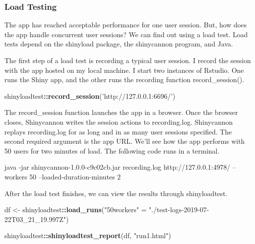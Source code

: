 \documentclass[]{article}
\newenvironment{Shaded}{\begin{snugshade}}{\end{snugshade}}
\newcommand{\ExtensionTok}[1]{#1}
\newcommand{\KeywordTok}[1]{\textcolor[rgb]{0.13,0.29,0.53}{\textbf{#1}}}
\newcommand{\NormalTok}[1]{#1}
\newcommand{\OperatorTok}[1]{\textcolor[rgb]{0.81,0.36,0.00}{\textbf{#1}}}
\newcommand{\StringTok}[1]{\textcolor[rgb]{0.31,0.60,0.02}{#1}}
\begin{document}
\hypertarget{load-testing}{%
\subsubsection{Load Testing}\label{load-testing}}

The app has reached acceptable performance for one user session. But,
how does the app handle concurrent user sessions? We can find out using
a load test. Load tests depend on the shinyload package, the shinycannon
program, and Java.

The first step of a load test is recording a typical user session. I
record the session with the app hosted on my local machine. I start two
instances of Rstudio. One runs the Shiny app, and the other runs the
recording function record\_session().

\begin{Shaded}
\begin{Highlighting}[]
\NormalTok{shinyloadtest}\OperatorTok{::}\KeywordTok{record_session}\NormalTok{(}\StringTok{'http://127.0.0.1:6696/'}\NormalTok{)}
\end{Highlighting}
\end{Shaded}

The record\_session function launches the app in a browser. Once the
browser closes, Shinycannon writes the session actions to recording.log.
Shinycannon replays recording.log for as long and in as many user
sessions specified. The second required argument is the app URL. We'll
see how the app performs with 50 users for two minutes of load. The
following code runs in a terminal.

\begin{Shaded}
\begin{Highlighting}[]
\ExtensionTok{java}\NormalTok{ -jar shinycannon-1.0.0-c9c02cb.jar recording.log http://127.0.0.1:4978/ --workers 50 --loaded-duration-minutes 2}
\end{Highlighting}
\end{Shaded}

After the load test finishes, we can view the results through
shinyloadtest.

\begin{Shaded}
\begin{Highlighting}[]
\NormalTok{df <-}\StringTok{ }\NormalTok{shinyloadtest}\OperatorTok{::}\KeywordTok{load_runs}\NormalTok{(}\StringTok{"50workers"}\NormalTok{ =}\StringTok{ "./test-logs-2019-07-22T03_21_19.997Z"}\NormalTok{)}

\NormalTok{shinyloadtest}\OperatorTok{::}\KeywordTok{shinyloadtest_report}\NormalTok{(df, }\StringTok{"run1.html"}\NormalTok{)}
\end{Highlighting}
\end{Shaded}
\end{document}

